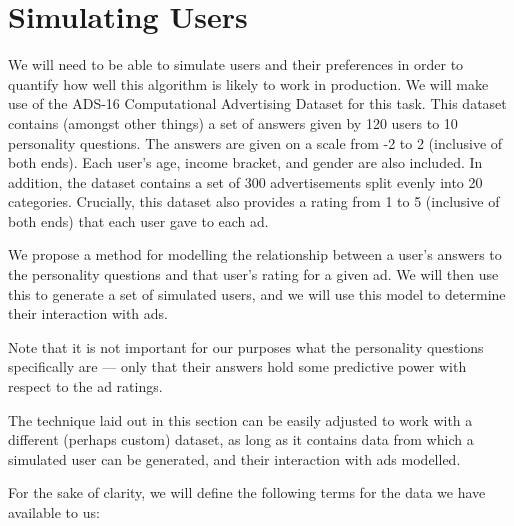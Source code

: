 \section{Simulating Users}

We will need to be able to simulate users and their preferences in order to quantify how well this algorithm is likely to work in production. We will make use of the ADS-16 Computational Advertising Dataset\cite{ads16} for this task. This dataset contains (amongst other things) a set of answers given by 120 users to 10 personality questions. The answers are given on a scale from -2 to 2 (inclusive of both ends). Each user's age, income bracket, and gender are also included. In addition, the dataset contains a set of 300 advertisements split evenly into 20 categories. Crucially, this dataset also provides a rating from 1 to 5 (inclusive of both ends) that each user gave to each ad.

We propose a method for modelling the relationship between a user's answers to the personality questions and that user's rating for a given ad. We will then use this to generate a set of simulated users, and we will use this model to determine their interaction with ads.

Note that it is not important for our purposes what the personality questions specifically are --- only that their answers hold some predictive power with respect to the ad ratings.

The technique laid out in this section can be easily adjusted to work with a different (perhaps custom) dataset, as long as it contains data from which a simulated user can be generated, and their interaction with ads modelled.

For the sake of clarity, we will define the following terms for the data we have available to us:

